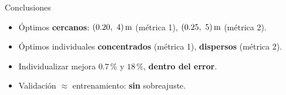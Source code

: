 \begin{frame}{Conclusiones}
  \begin{itemize}\setlength{\itemsep}{14pt}
    \item Óptimos \textbf{cercanos}: $(0.20,\ 4)\,\mathrm{m}$ (métrica 1), $(0.25,\ 5)\,\mathrm{m}$ (métrica 2).
    \item Óptimos individuales \textbf{concentrados} (métrica 1), \textbf{dispersos} (métrica 2).
    \item Individualizar mejora $0.7$\,\% y $18$\,\%, \textbf{dentro del error}.
    \item Validación $\approx$ entrenamiento: \textbf{sin} sobreajuste.
  \end{itemize}
\end{frame}
